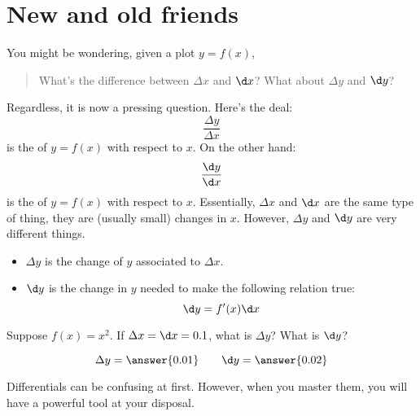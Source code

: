 \documentclass{ximera}
\begin{document}
\section{New and old friends}

You might be wondering, given a plot $y=f(x)$,
\begin{quote}
  What's the difference between $\Delta x$ and $\d x$? What about
  $\Delta y$ and $\d y$?
\end{quote}
Regardless, it is now a pressing question. Here's the deal: 
\[
\frac{\Delta y}{\Delta x}
\]
is the  of $y=f(x)$ with respect to $x$.
On the other hand:
\[
\frac{\d y}{\d x}
\]
is the  of $y=f(x)$ with respect to
$x$. Essentially, $\Delta x$ and $\d x$ are the same type of thing,
they are (usually small) changes in $x$. However, $\Delta y$ and $\d
y$ are very different things.
\begin{itemize}
\item $\Delta y$ is the change of $y$ associated to $\Delta x$.
\item $\d y$ is the change in $y$ needed to make the following relation true:
  \[
  \d y = f'(x)\d x
  \]
\end{itemize}
\begin{question}
  Suppose $f(x) = x^2$. If $\Delta x =\d x = 0.1$, what is $\Delta y$? What
  is $\d y$?
  \begin{prompt}
    \[
    \Delta y = \answer{0.01}\qquad \d y = \answer{0.02}
    \]
  \end{prompt}
\end{question}
Differentials can be confusing at first. However, when you master
them, you will have a powerful tool at your disposal.
\end{document}
